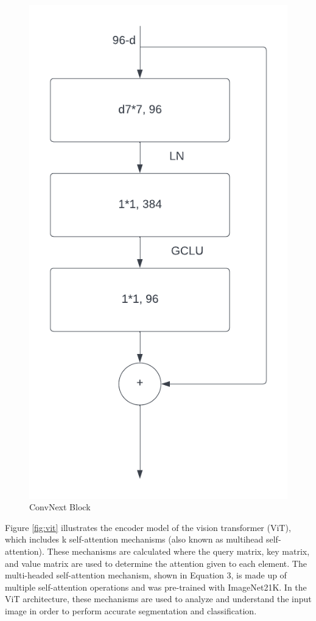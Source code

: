 \begin{itemize}
        \begin{figure}[htb]
            \centering
            \includegraphics[scale=.7]{figures/convnext.png}
            \caption{ConvNext Block \cite{peng2022cnn}}
            \label{fig:convnext}
        \end{figure}
        Figure \ref{fig:vit} illustrates the encoder model of the vision transformer (ViT), which includes k self-attention mechanisms (also known as multihead self-attention). These mechanisms are calculated where the query matrix, key matrix, and value matrix are used to determine the attention given to each element. The multi-headed self-attention mechanism, shown in Equation 3, is made up of multiple self-attention operations and was pre-trained with ImageNet21K. In the ViT architecture, these mechanisms are used to analyze and understand the input image in order to perform accurate segmentation and classification.


\end{itemize}

